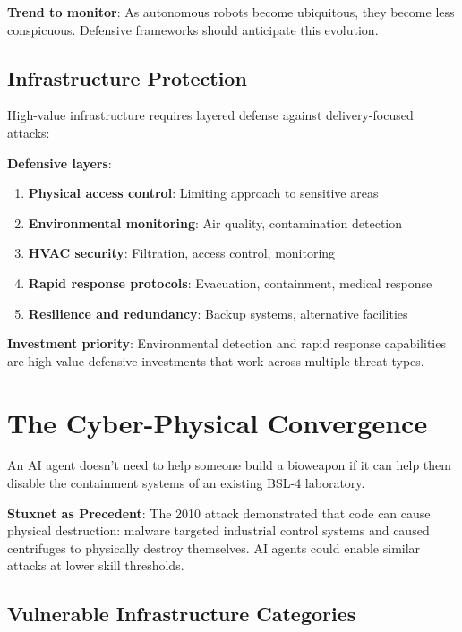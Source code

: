\documentclass[11pt,letterpaper]{article}
\begin{document}
\textbf{Trend to monitor}: As autonomous robots become ubiquitous, they become less conspicuous. Defensive frameworks should anticipate this evolution.

\subsection{Infrastructure Protection}

High-value infrastructure requires layered defense against delivery-focused attacks:

\textbf{Defensive layers}:
\begin{enumerate}[nosep]
  \item \textbf{Physical access control}: Limiting approach to sensitive areas
  \item \textbf{Environmental monitoring}: Air quality, contamination detection
  \item \textbf{HVAC security}: Filtration, access control, monitoring
  \item \textbf{Rapid response protocols}: Evacuation, containment, medical response
  \item \textbf{Resilience and redundancy}: Backup systems, alternative facilities
\end{enumerate}

\textbf{Investment priority}: Environmental detection and rapid response capabilities are high-value defensive investments that work across multiple threat types.

\section{The Cyber-Physical Convergence}

\begin{keybox}
An AI agent doesn't need to help someone build a bioweapon if it can help them disable the containment systems of an existing BSL-4 laboratory.
\end{keybox}

\textbf{Stuxnet as Precedent}: The 2010 attack demonstrated that code can cause physical destruction: malware targeted industrial control systems and caused centrifuges to physically destroy themselves. AI agents could enable similar attacks at lower skill thresholds.

\subsection{Vulnerable Infrastructure Categories}
\end{document}
